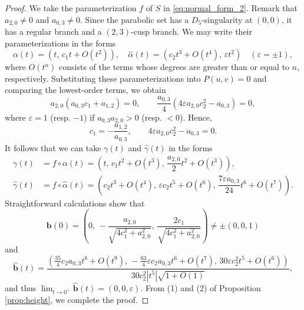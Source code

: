 \documentclass[10pt,a4paper]{amsart}
\renewcommand{\epsilon}{\varepsilon}
\begin{document}
\begin{proof}
We take the parameterization $f$ of $S$ in \eqref{eq:normal_form_2}.
Remark that $a_{2,0}\ne0$ and $a_{0,3}\ne0$. 
Since the parabolic set has a $D_5$-singularity at $(0,0)$, it has a regular branch and a $(2,3)$-cusp branch. 
We may write their parameterizations in the forms
\begin{equation*}
\alpha(t) = \left(t,\, c_1 t + O(t^2)\right),\quad \hat\alpha(t) = (c_2 t^3 + O(t^4),\, \epsilon t^2)\quad(\epsilon=\pm1),
\end{equation*}
where $O(t^n)$ consists of the terms whose degrees are greater than or equal to $n$, respectively. 
Substituting these parameterizations into $P(u,v)=0$ and comparing the lowest-order terms, we obtain 
$$
a_{2,0}(a_{0,3}c_1+a_{1,2})=0,\qquad \dfrac{a_{0,3}}4(4\epsilon a_{2,0} c_2^2 - a_{0,3})=0,
$$
where $\epsilon = 1$ (resp. $-1$) if $a_{0,3}a_{2,0} > 0$ (resp. $< 0$). 
Hence, 
$$
c_1 = -\dfrac{a_{1,2}}{a_{0,3}},\qquad 4\epsilon a_{2,0} c_2^2 - a_{0,3} = 0.
$$
It follows that we can take $\gamma(t)$ and $\hat\gamma(t)$ in the forms
\begin{align*}
\gamma(t) & = f \circ \alpha(t) = \left(t,\, c_1 t^2 + O(t^3),\, \dfrac{a_{2,0}}2t^2 + O(t^3)\right), \\
\hat\gamma(t) & = f \circ \hat\alpha(t) = \left(c_2 t^3 + O(t^4),\, \epsilon c_2 t^5 + O(t^6),\, \dfrac{7\epsilon a_{0,3}}{24} t^6 + O(t^7)\right).
\end{align*}
Straightforward calculations show that
\[
\bm{b}(0) = \left(0,\, -\dfrac{a_{2,0}}{\sqrt{4c_1^2 + a_{2,0}^2}},\, \dfrac{2c_1}{\sqrt{4c_1^2 + a_{2,0}^2}}\right)\ne \pm(0,0,1)
\]
and
\[
\hat{\bm{b}}(t) =\dfrac{\left(\frac{35}4 c_2 a_{0,3}t^8 + O(t^9),\, -\frac{63}4 \epsilon c_2 a_{0,3} t^6 + O(t^7),\, 30 \epsilon c_2^2 t^5 + O(t^6)\right)}{30 c_2^2 |t^5| \sqrt{1 + O(1)}},
 \]
and thus $\lim_{t\to 0^+}\hat{\bm{b}}(t) = (0,0,\epsilon)$.
From (1) and (2) of Proposition \ref{prop:height}, we complete the proof. 
\end{proof}
\end{document}
